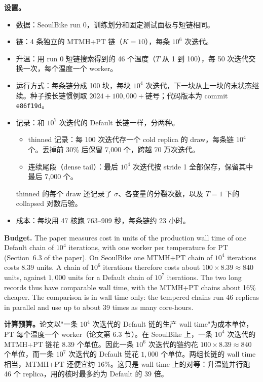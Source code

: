 \documentclass[11pt]{article}
\begin{document}
\begin{zhbox}
\textbf{设置。}
\begin{itemize}
\item 数据：SeoulBike run 0，训练划分和固定测试面板与短链相同。
\item 链：4 条独立的 MTMH+PT 链（$K=10$），每条 $10^6$ 次迭代。
\item 升温：用 run 0 短链搜索得到的 46 个温度（$T$ 从 1 到 100），每 50 次迭代交换一次，每个温度一个 worker。
\item 运行方式：每条链分成 100 块，每块 $10^4$ 次迭代，下一块从上一块的末状态继续。种子按长链惯例取 $2024+100{,}000+\text{链号}$；代码版本为 commit \texttt{e86f19d}。
\item 记录：和 $10^7$ 次迭代的 Default 长链一样，分两种。
\begin{itemize}
\item thinned 记录：每 100 次迭代存一个 cold replica 的 draw，每条链 $10^4$ 个。丢掉前 30\% 后保留 7,000 个，跨越 70 万次迭代。
\item 连续尾段（dense tail）：最后 $10^4$ 次迭代按 stride 1 全部保存，保留其中最后 7,000 个。
\end{itemize}
thinned 的每个 draw 还记录了 $\sigma$、各变量的分裂次数，以及 $T=1$ 下的 collapsed 对数后验。
\item 成本：每块用 47 核跑 763--909 秒，每条链约 23 小时。
\end{itemize}
\end{zhbox}


\textbf{Budget.} The paper measures cost in units of the production wall time of one Default chain of $10^4$ iterations, with one worker per temperature for PT (Section~6.3 of the paper). On SeoulBike one MTMH+PT chain of $10^4$ iterations costs 8.39 units. A chain of $10^6$ iterations therefore costs about $100\times8.39\approx840$ units, against $1{,}000$ units for a Default chain of $10^7$ iterations. The two long records thus have comparable wall time, with the MTMH+PT chains about 16\% cheaper. The comparison is in wall time only: the tempered chains run 46 replicas in parallel and use up to about 39 times as many core-hours.

\begin{zhbox}
\textbf{计算预算。}论文以"一条 $10^4$ 次迭代的 Default 链的生产 wall time"为成本单位，PT 每个温度一个 worker（论文第 6.3 节）。在 SeoulBike 上，一条 $10^4$ 次迭代的 MTMH+PT 链花 8.39 个单位。因此一条 $10^6$ 次迭代的链约花 $100\times8.39\approx840$ 个单位，而一条 $10^7$ 次迭代的 Default 链花 $1{,}000$ 个单位。两组长链的 wall time 相当，MTMH+PT 还便宜约 16\%。这只是 wall time 上的对等：升温链并行跑 46 个 replica，用的核时最多约为 Default 的 39 倍。
\end{zhbox}
\end{document}
